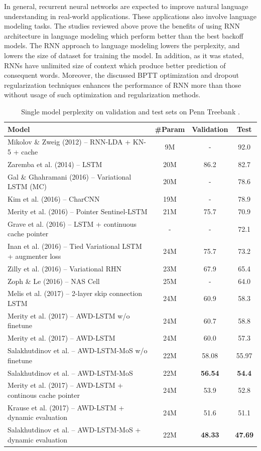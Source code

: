 \documentclass{IEEEtran}
\begin{document}
In general, recurrent neural networks are expected to improve natural language understanding in real-world applications. These applications also involve language modeling tasks. The studies reviewed above prove the benefits of using RNN architecture in language modeling which perform better than the best backoff models. The RNN approach to language modeling lowers the perplexity, and lowers the size of dataset for training the model. In addition, as it was stated, RNNs have unlimited size of context which produce better prediction of consequent words. Moreover, the discussed BPTT optimization and dropout regularization techniques enhances the performance of RNN more than those without usage of such optimization and regularization methods.

\begin{table}[!t]
\caption{Single model perplexity on validation and test sets on Penn Treebank \cite{Salakhutdinov2017Softmax}.}
\label{tab:softmax}
\centering
\begin{tabular}{ l|c c c }
\toprule
\textbf{Model} & \textbf{#Param} & \textbf{Validation} & \textbf{Test} \\
\hline
Mikolov \& Zweig (2012) -- RNN-LDA + KN-5 + cache & 9M & - & 92.0 \\
Zaremba et al. (2014) -- LSTM & 20M & 86.2 & 82.7 \\
Gal \& Ghahramani (2016) -- Variational LSTM (MC) & 20M & - & 78.6 \\
Kim et al. (2016) -- CharCNN & 19M & - & 78.9 \\
Merity et al. (2016) -- Pointer Sentinel-LSTM & 21M & 75.7 & 70.9 \\
Grave et al. (2016) -- LSTM + continuous cache pointer & - & - & 72.1 \\
Inan et al. (2016) -- Tied Variational LSTM + augmenter loss & 24M & 75.7 & 73.2 \\
Zilly et al. (2016) -- Variational RHN & 23M & 67.9 & 65.4 \\
Zoph \& Le (2016) -- NAS Cell & 25M & - & 64.0 \\
Melis et al. (2017) -- 2-layer skip connection LSTM & 24M & 60.9 & 58.3 \\
\hline
Merity et al. (2017) -- AWD-LSTM w/o finetune & 24M & 60.7 & 58.8 \\
Merity et al. (2017) -- AWD-LSTM & 24M & 60.0 & 57.3 \\
Salakhutdinov et al. \cite{Salakhutdinov2017Softmax} -- AWD-LSTM-MoS w/o finetune & 22M & 58.08 & 55.97 \\
Salakhutdinov et al. \cite{Salakhutdinov2017Softmax} -- AWD-LSTM-MoS & 22M & \textbf{56.54} & \textbf{54.4} \\
\hline
Merity et al. (2017) -- AWD-LSTM + continous cache pointer & 24M & 53.9 & 52.8 \\
Krause et al. (2017) -- AWD-LSTM + dynamic evaluation & 24M & 51.6 & 51.1 \\
Salakhutdinov et al. \cite{Salakhutdinov2017Softmax} -- AWD-LSTM-MoS + dynamic evaluation & 22M & \textbf{48.33} & \textbf{47.69} \\
\bottomrule
\end{tabular}
\end{table}
\end{document}
